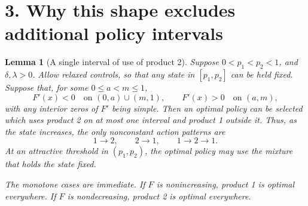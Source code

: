 \documentclass[11pt]{article}
\newtheorem{lemma}{Lemma}
\begin{document}
\section*{3. Why this shape excludes additional policy intervals}
\begin{lemma}[A single interval of use of product 2]
\label{lem:fluid-single-interval}
Suppose $0<p_1<p_2<1$, and $\delta,\lambda>0$.
Allow relaxed controls, so that any state in $[p_1,p_2]$ can be held fixed.
Suppose that, for some $0\leq a<m\leq 1$,
\begin{equation}
       F'(x)<0 \quad \text{on } (0,a)\cup(m,1),
       \qquad
       F'(x)>0 \quad \text{on } (a,m),
\end{equation}
with any interior zeros of $F'$ being simple. Then an optimal policy can be
selected which uses product 2 on at most one interval and product 1 outside it.
Thus, as the state increases, the only nonconstant action patterns are
\begin{equation}
       1\to2,\qquad 2\to1,\qquad 1\to2\to1.
\end{equation}
At an attractive threshold in $(p_1,p_2)$, the optimal policy may use the
mixture that holds the state fixed.

The monotone cases are immediate. If $F$ is nonincreasing, product 1 is optimal
everywhere. If $F$ is nondecreasing, product 2 is optimal everywhere.
\end{lemma}
\end{document}
